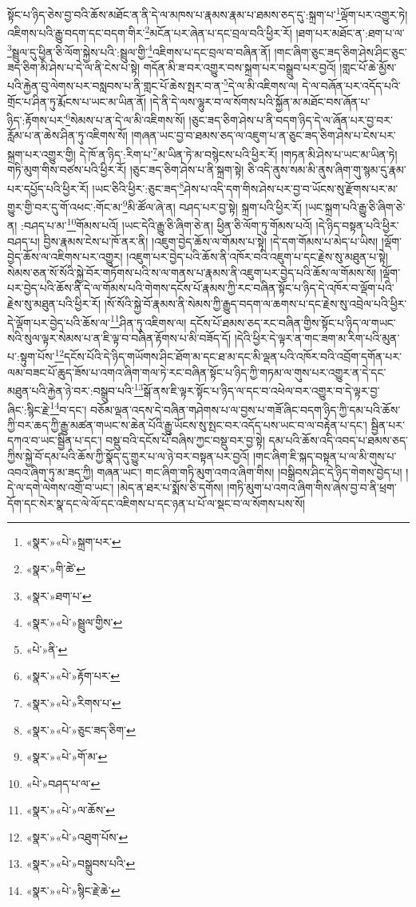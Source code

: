 སྟོང་པ་ཉིད་ཅེས་བྱ་བའི་ཆོས་མཐོང་ན་ནི་དེ་ལ་མཁས་པ་རྣམས་རྣམ་པ་ཐམས་ཅད་དུ་:སྐྲག་པ་\footnote{«སྣར་»«པེ་»སྐྲག་པར་}ལྡོག་པར་འགྱུར་ཏེ། འཇིགས་པའི་རྒྱུ་བདག་དང་བདག་གིར་\footnote{«སྣར་»གི་ཚེ་}མངོན་པར་ཞེན་པ་དང་བྲལ་བའི་ཕྱིར་རོ། །ཐག་པར་མཐོང་ན་:ཐག་པ་ལ་\footnote{«སྣར་»ཐག་པ་}སྦྲུལ་དུ་ཕྱིན་ཅི་ལོག་སྐྱེས་པའི་:སྦྲུལ་གྱི་\footnote{«སྣར་»«པེ་»སྦྲུལ་གྱིས་}འཇིགས་པ་དང་བྲལ་བ་བཞིན་ནོ། །གང་ཞིག་ཅུང་ཟད་ཅིག་ཤེས་ཤིང་ཅུང་ཟད་ཅིག་མི་ཤེས་པ་དེ་ལ་ནི་ངེས་པ་སྟེ། གདོན་མི་ཟ་བར་འགྱུར་བས་སྐྲག་པར་བསྒྲུབ་པར་བྱའོ། །གླང་པོ་ཆེ་མྱོས་པའི་རྐྱེན་བུ་ལེགས་པར་བསླབས་པ་ནི་གླང་པོ་ཆེས་སྤར་བ་ན་\footnote{«པེ་»ནི་}དེ་ལ་མི་འཇིགས་ལ། དེ་ལ་བཞོན་པར་འདོད་པའི་གྲོང་པ་ཤིན་ཏུ་རྨོངས་པ་ཡང་མ་ཡིན་ནོ། །དེ་ནི་དེ་ལས་ལྷུར་བ་ལ་སོགས་པའི་སྐྱོན་མ་མཐོང་བས་ཞོན་པ་ཉིད་:རྟོགས་པར་\footnote{«སྣར་»«པེ་»རྟོག་པར་}སེམས་པ་ན་དེ་ལ་མི་འཇིགས་སོ། །ཅུང་ཟད་ཅིག་ཤེས་པ་ནི་བདག་ཉིད་དེ་ལ་ཞོན་པར་བྱ་བར་རློམ་པ་ན་ཆེས་ཤིན་ཏུ་འཇིགས་སོ། །གཞན་ཡང་བྱ་བ་ཐམས་ཅད་ལ་འཇུག་པ་ན་ཅུང་ཟད་ཅིག་ཤེས་པ་ངེས་པར་སྐྲག་པར་འགྱུར་གྱི། དེ་ཁོ་ན་ཉིད་:རིག་པ་\footnote{«སྣར་»«པེ་»རིགས་པ་}མ་ཡིན་ཏེ་མ་བསྙེངས་པའི་ཕྱིར་རོ། །གཏན་མི་ཤེས་པ་ཡང་མ་ཡིན་ཏེ། གཏི་མུག་གིས་བཙས་པའི་ཕྱིར་རོ། །ཅུང་ཟད་ཅིག་ཤེས་པ་ནི་སྐྲག་སྟེ། ཅི་འདི་ནུས་སམ་མི་ནུས་ཞིག་གུ་སྙམ་དུ་རྣམ་པར་དཔྱོད་པའི་ཕྱིར་རོ། །ཡང་ཅིའི་ཕྱིར་:ཅུང་ཟད་\footnote{«སྣར་»«པེ་»ཅུང་ཟད་ཅིག་}ཤེས་པ་འདི་དག་གིས་ཤེས་པར་བྱ་བ་ཡོངས་སུ་རྫོགས་པར་མ་གྱུར་གྱི་བར་དུ་གོ་འཕང་:གོང་མ་\footnote{«སྣར་»«པེ་»གོ་མ་}མི་ཚོལ་ཞེ་ན། བཤད་པར་བྱ་སྟེ། སྐྲག་པའི་ཕྱིར་རོ། །ཡང་སྐྲག་པའི་རྒྱུ་ཅི་ཞིག་ཅེ་ན། :བཤད་པ་མ་\footnote{«པེ་»བཤད་པ་ལ་}གོམས་པའོ། །ཡང་དེའི་རྒྱུ་ཅི་ཞིག་ཅེ་ན། ཕྱིན་ཅི་ལོག་ཏུ་གོམས་པའོ། །དེ་ཉིད་བསྟན་པའི་ཕྱིར་བཤད་པ། བྱིས་རྣམས་ངེས་པ་ཁོ་ནར་ནི། །འཇུག་བྱེད་ཆོས་ལ་གོམས་པ་སྟེ། །དེ་དག་གོམས་པ་མེད་པ་ཡིས། །ལྡོག་བྱེད་ཆོས་ལ་འཇིགས་པར་འགྱུར། །འཇུག་པར་བྱེད་པའི་ཆོས་ནི་འཁོར་བའི་འཇུག་པ་དང་རྗེས་སུ་མཐུན་པ་སྟེ། སེམས་ཅན་སོ་སོའི་སྐྱེ་བོར་གཏོགས་པའི་ས་ལ་གནས་པ་རྣམས་ནི་འཇུག་པར་བྱེད་པའི་ཆོས་ལ་གོམས་སོ། །ལྡོག་པར་བྱེད་པའི་ཆོས་ནི་དེ་ལ་གོམས་པའི་གེགས་དངོས་པོ་རྣམས་ཀྱི་རང་བཞིན་སྟོང་པ་ཉིད་དེ་འཁོར་བ་ལྡོག་པའི་རྗེས་སུ་མཐུན་པའི་ཕྱིར་རོ། །སོ་སོའི་སྐྱེ་བོ་རྣམས་ནི་སེམས་ཀྱི་རྒྱུད་བདག་ལ་ཆགས་པ་དང་རྗེས་སུ་འབྲེལ་པའི་ཕྱིར་དེ་ལྡོག་པར་བྱེད་པའི་ཆོས་ལ་\footnote{«སྣར་»«པེ་»ལ་ཆོས་}ཤིན་ཏུ་འཇིགས་ལ། དངོས་པོ་ཐམས་ཅད་རང་བཞིན་གྱིས་སྟོང་པ་ཉིད་ལ་གཡང་སའི་སུལ་ལྟར་སེམས་པ་ན་ཇི་ལྟ་བ་བཞིན་རྟོགས་པ་མི་བཟོད་དོ། །དེའི་ཕྱིར་དེ་ལྟར་ན་གང་ཟག་མ་རིག་པའི་མུན་པ་:སྟུག་པོས་\footnote{«སྣར་»«པེ་»འཐུག་པོས་}དངོས་པོའི་དེ་ཉིད་གཡོགས་ཤིང་ཐོག་མ་དང་ཐ་མ་དང་མི་ལྡན་པའི་འཁོར་བའི་འབྲོག་དགོན་པར་ལམ་བཟང་པོ་ཆུད་ཟོས་པ་འགའ་ཞིག་གལ་ཏེ་རང་བཞིན་སྟོང་པ་ཉིད་ཀྱི་གཏམ་ལ་གུས་པར་འགྱུར་ན་དེ་དང་མཐུན་པའི་རྐྱེན་ཉེ་བར་:བསྒྲུབ་པའི་\footnote{«སྣར་»«པེ་»བསྒྲུབས་པའི་}སྒོ་ནས་ཇི་ལྟར་སྟོང་པ་ཉིད་ལ་དང་བ་འཕེལ་བར་འགྱུར་བ་དེ་ལྟར་བྱ་ཞིང་:སྙིང་རྗེ་\footnote{«སྣར་»«པེ་»སྙིང་རྗེ་ཆེ་}བ་དང་། བཅོམ་ལྡན་འདས་དེ་བཞིན་གཤེགས་པ་ལ་བྱས་པ་གཟོ་ཞིང་བདག་ཉིད་ཀྱི་དམ་པའི་ཆོས་ཀྱི་བར་ཆད་ཀྱི་རྒྱུ་མཚན་གཡང་ས་ཆེན་པོའི་རྒྱུ་ཡོངས་སུ་སྤང་བར་འདོད་པས་ཡང་བ་ལ་བརྟེན་པ་དང་། སྦྱིན་པར་དཀའ་བ་ཡང་སྦྱིན་པ་དང་། བསྡུ་བའི་དངོས་པོ་བཞིས་ཀྱང་བསྡུ་བར་བྱ་སྟེ། དམ་པའི་ཆོས་འདི་འབད་པ་ཐམས་ཅད་ཀྱིས་སྐྱེ་བོ་དམ་པའི་ཆོས་ཀྱི་སྣོད་དུ་གྱུར་པ་ལ་ཉེ་བར་བསྟན་པར་བྱའོ། །གང་ཞིག་ཇི་སྐད་བསྟན་པ་ལ་མི་གུས་པ་འབའ་ཞིག་ཏུ་མ་ཟད་ཀྱི། གཞན་ཡང་། གང་ཞིག་གཏི་མུག་འགའ་ཞིག་གིས། །བསྒྲིབས་ཤིང་དེ་ཉིད་གེགས་བྱེད་པ། །དེ་ལ་དགེ་ལེགས་འགྲོ་བ་ཡང་། །མེད་ན་ཐར་པ་སྨོས་ཅི་དགོས། །གཏི་མུག་པ་འགའ་ཞིག་གིས་ཞེས་བྱ་བ་ནི་ཕྲག་དོག་དང་སེར་སྣ་དང་ལེ་ལོ་དང་འཇིགས་པ་དང་ཉན་པ་པོ་ལ་སྡང་བ་ལ་སོགས་པས་སོ། 